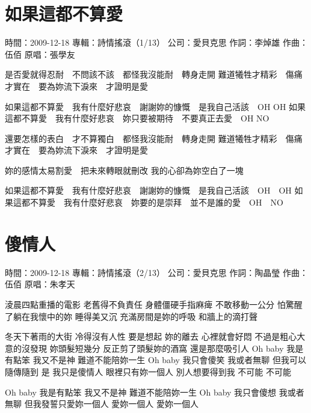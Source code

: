 \documentclass[UTF8,a4paper,oneside,twocolumn,12pt]{ctexbook}
\newcommand{\infopair}[2]{\textbullet #1：#2}
\newcommand{\zc}[1][伍佰]{\infopair{作詞}{#1}}
\newcommand{\zq}[1][伍佰]{\infopair{作曲}{#1}}
\newcommand{\zj}[1]{\infopair{專輯}{#1}}
\newcommand{\yc}[1]{\infopair{原唱}{#1}}
\newcommand{\sj}[1]{\infopair{時間}{#1}}
\newcommand{\gs}[1]{\infopair{公司}{#1}}
\newenvironment{info}{\begin{flushleft}\kaishu
	}
	{\end{flushleft}\normalsize\yahei\par}
\newenvironment{lyric}{
	}
{}
\begin{document}
\section{如果這都不算愛}
\begin{info}
	\sj{2009-12-18}
	\zj{詩情搖滾（1/13）}
	\gs{愛貝克思}
	\zc[李焯雄]
	\zq
	\yc{張學友}
\end{info}
\begin{lyric}
	是否愛就得忍耐　不問該不該　都怪我沒能耐　轉身走開
	難道犧牲才精彩　傷痛才實在　要為妳流下淚來　才證明是愛

	如果這都不算愛　我有什麼好悲哀　謝謝妳的慷慨　是我自己活該　OH OH
	如果這都不算愛　我有什麼好悲哀　妳只要被期待　不要真正去愛　OH NO

	還要怎樣的表白　才不算獨白　都怪我沒能耐　轉身走開
	難道犧牲才精彩　傷痛才實在　要為妳流下淚來　才證明是愛

	妳的感情太易割愛　把未來轉眼就刪改
	我的心卻為妳空白了一塊

	如果這都不算愛　我有什麼好悲哀　謝謝妳的慷慨　是我自己活該　OH　OH
	如果這都不算愛　我有什麼好悲哀　妳要的是崇拜　並不是誰的愛　OH　NO
\end{lyric}

\section{傻情人}
\begin{info}
	\sj{2009-12-18}
	\zj{詩情搖滾（2/13）}
	\gs{愛貝克思}
	\zc[陶晶瑩]
	\zq
	\yc{朱孝天}
\end{info}
\begin{lyric}
	淩晨四點重播的電影 老舊得不負責任
	身體僵硬手指麻痺 不敢移動一公分
	怕驚醒了躺在我懷中的妳 睡得美又沉
	充滿房間是妳的呼吸 和牆上的滴打聲

	冬天下著雨的大街 冷得沒有人性
	要是想起 妳的離去 心裡就會好悶
	不過是粗心大意的沒發現 妳頭髮短幾分
	反正剪了頭髮妳的酒窩 還是那麼吸引人
	Oh baby 我是有點笨 我又不是神
	難道不能陪妳一生
	Oh baby 我只會傻笑 我或者無聊
	但我可以隨傳隨到
	是 我只是傻情人 眼裡只有妳一個人
	別人想要得到我 不可能 不可能

	Oh baby 我是有點笨 我又不是神
	難道不能陪妳一生
	Oh baby 我只會傻想 我或者無聊
	但我發誓只愛妳一個人 愛妳一個人 愛妳一個人
\end{lyric}
\end{document}
